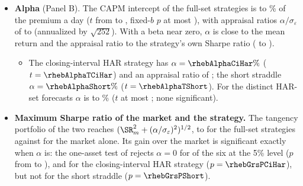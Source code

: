 \begin{itemize}
\begin{itemize}
    and on their short days negatively, \rhebThirtyTmGammaShortFullMin{} to \rhebThirtyTmGammaShortFullMax{} ($t$
    from \rhebThirtyTmGammaShortTFullMin{} to \rhebThirtyTmGammaShortTFullMax; percent of the premium per squared
    percent of index return). These $t$-statistics are descriptive: the long and short days are not consecutive.
  \item Over all days the full-set strategies are short the squared half-hour move, $\gamma$ from
    \rhebThirtyTmGammaFullMin{} to \rhebThirtyTmGammaFullMax{} ($t$ from \rhebThirtyTmGammaTFullMin{} to
    \rhebThirtyTmGammaTFullMax), against \rhebThirtyTmGammaShort{} ($t = \rhebThirtyTmGammaTShort$) for the short
    straddle, and they carry no slope on its sign ($\beta$ on $r^{30}_t$ with $t$ at most
    \rhebThirtyBetaTFullMax).
  \end{itemize}
\item \textbf{Alpha} (Panel B). The CAPM intercept of the full-set strategies is \rhebAlphaFullMin{} to
  \rhebAlphaFullMax\% of the premium a day ($t$ from \rhebAlphaTFullMin{} to \rhebAlphaTFullMax, fixed-$b$ $p$ at most
  \rhebAlphaPFullMax), with appraisal ratios $\alpha/\sigma_\varepsilon$ of \rhebARFullMin{} to \rhebARFullMax{}
  (annualized by $\sqrt{252}$). With a beta near zero, $\alpha$ is close to the mean return and the appraisal ratio
  to the strategy's own Sharpe ratio (\rhebSRsFullMin{} to \rhebSRsFullMax).
  \begin{itemize}
  \item The closing-interval HAR strategy has $\alpha = \rhebAlphaCiHar\%$ ($t = \rhebAlphaTCiHar$) and an appraisal
    ratio of \rhebARCiHar; the short straddle $\alpha = \rhebAlphaShort\%$ ($t = \rhebAlphaTShort$). For the
    \rhebNHarDistinctWord{} distinct HAR-set forecasts $\alpha$ is \rhebAlphaHarMin{} to \rhebAlphaHarMax\% ($t$ at
    most \rhebAlphaTHarMax; none significant).
  \end{itemize}
\item \textbf{Maximum Sharpe ratio of the market and the strategy.} The tangency portfolio of the two reaches
  $(\SR_m^2 + (\alpha/\sigma_\varepsilon)^2)^{1/2}$, \rhebSRmaxFullMin{} to \rhebSRmaxFullMax{} for the full-set
  strategies against \rhebSRm{} for the market alone. Its gain over the market is significant exactly when $\alpha$
  is: the one-asset test of \citet{GibbonsRossShanken1989} rejects $\alpha = 0$ for \rhebGrsSigFullWord{} of the six at
  the 5\% level ($p$ from \rhebGrsPFullMin{} to \rhebGrsPFullMax), and for the closing-interval HAR strategy
  ($p = \rhebGrsPCiHar$), but not for the short straddle ($p = \rhebGrsPShort$).

\end{itemize}
